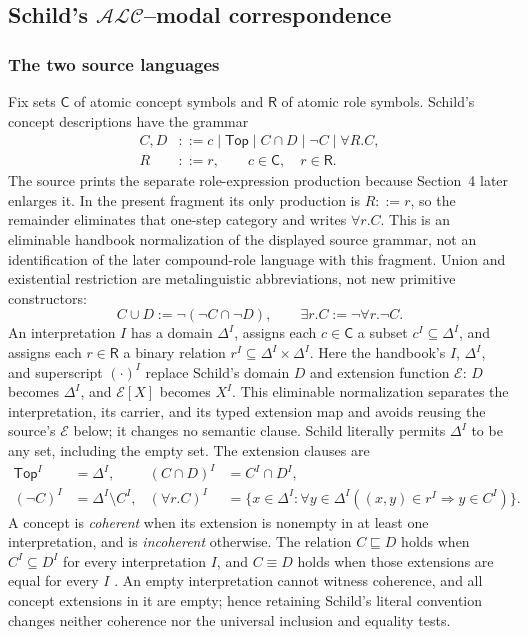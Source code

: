 
\subsection{Schild's \(\mathcal{ALC}\)--modal correspondence}
\label{sec:p09-presentation-n-c-011}

\subsubsection{The two source languages}

Fix sets \(\mathsf C\) of atomic concept symbols and \(\mathsf R\) of atomic
role symbols.  Schild's concept descriptions have the grammar
\[
 \begin{aligned}
 C,D &::= c\mid\mathsf{Top}\mid C\cap D\mid\neg C\mid\forall R.C,\\
 R &::= r,
 \qquad c\in\mathsf C,\quad r\in\mathsf R.
 \end{aligned}
\]
The source prints the separate role-expression production because Section~4
later enlarges it.  In the present fragment its only production is \(R::=r\),
so the remainder eliminates that one-step category and writes \(\forall r.C\).
This is an eliminable handbook normalization of the displayed source grammar,
not an identification of the later compound-role language with this fragment.
Union and existential restriction are metalinguistic abbreviations, not new
primitive constructors:
\[
 C\cup D := \neg(\neg C\cap\neg D),
 \qquad
 \exists r.C := \neg\forall r.\neg C.
\]
An interpretation \(I\) has a domain \(\Delta^I\), assigns each
\(c\in\mathsf C\) a subset \(c^I\subseteq\Delta^I\), and assigns each
\(r\in\mathsf R\) a binary relation
\(r^I\subseteq\Delta^I\times\Delta^I\).  Here the handbook's
\(I\), \(\Delta^I\), and superscript \((\cdot)^I\) replace Schild's domain
\(D\) and extension function \(\mathcal E\): \(D\) becomes \(\Delta^I\), and
\(\mathcal E[X]\) becomes \(X^I\).  This eliminable normalization separates
the interpretation, its carrier, and its typed extension map and avoids
reusing the source's \(\mathcal E\) below; it changes no semantic clause.
Schild literally permits
\(\Delta^I\) to be any set, including the empty set.  The extension clauses
are
\[
\begin{aligned}
 \mathsf{Top}^I&=\Delta^I,
 & (C\cap D)^I&=C^I\cap D^I,\\
 (\neg C)^I&=\Delta^I\setminus C^I,
 & (\forall r.C)^I
   &=\{x\in\Delta^I:\forall y\in\Delta^I
       ((x,y)\in r^I\Rightarrow y\in C^I)\}.
\end{aligned}
\]
A concept is \emph{coherent} when its extension is nonempty in at least one
interpretation, and is \emph{incoherent} otherwise.  The relation
\(C\sqsubseteq D\) holds when
\(C^I\subseteq D^I\) for every interpretation \(I\), and
\(C\equiv D\) holds when those extensions are equal for every \(I\)
\cite[p.~467]{Schild1991}.  An empty interpretation cannot witness coherence,
and all concept extensions in it are empty; hence retaining Schild's literal
convention changes neither coherence nor the universal inclusion and equality
tests.

